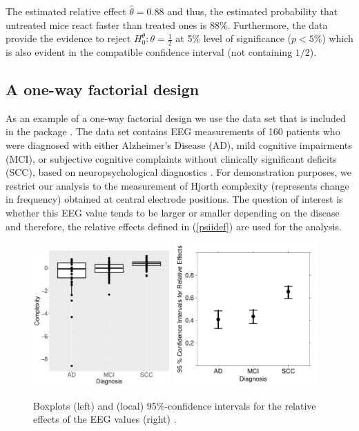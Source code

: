 The estimated relative effect $\widehat{\theta}=0.88$ and thus, the estimated 
probability that untreated mice react faster than treated ones is 88\%. 
Furthermore, the data provide the evidence to reject $H_0^\theta: \theta = 
\frac12$ at 5\% level of significance ($p<5\%$) which is also evident in the 
compatible confidence interval (not containing $1/2$).

\subsection{A one-way factorial design}

As an example of a one-way factorial design we use the data set  that 
is included in the package  
\citep{friedrich2019manovarm,MANOVARM}. The data set contains EEG measurements 
of 160 patients who were diagnosed with either Alzheimer's Disease (AD), mild 
cognitive impairments (MCI), or subjective cognitive complaints without 
clinically significant deficits (SCC), based on neuropsychological diagnostics 
\citep{bathke2018testing}. For demonstration purposes, we restrict our analysis 
to the measurement of Hjorth complexity (represents change in frequency) obtained at central electrode 
positions. The question of interest is whether this EEG value tends to be larger or smaller depending on the disease and 
therefore, the relative effects defined in (\ref{psiidef}) 
are used for the analysis.

\begin{figure}[t!]
	\centering
	\includegraphics[width=0.47\textwidth]{boxplot_EEG}
		\includegraphics[width=0.49\textwidth]{CI_EEG}
	\caption{\label{fig:EEG} Boxplots (left) and (local) 95\%-confidence intervals for the relative effects of the EEG values (right) .}
\end{figure}



